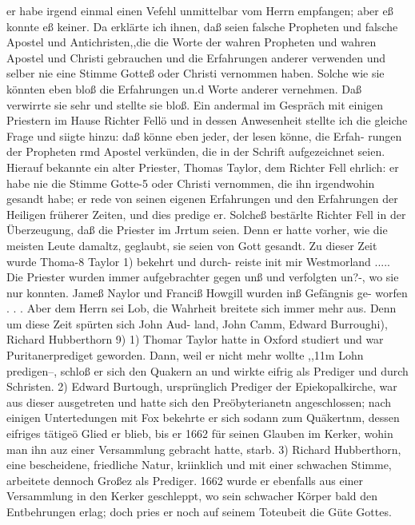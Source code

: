 er habe irgend einmal einen Vefehl unmittelbar vom Herrn
empfangen; aber eß konnte eß keiner. Da erklärte ich ihnen, daß
seien falsche Propheten und falsche Apostel und Antichristen,,die
die Worte der wahren Propheten und wahren Apostel und Christi
gebrauchen und die Erfahrungen anderer verwenden und selber
nie eine Stimme Gotteß oder Christi vernommen haben. Solche
wie sie könnten eben bloß die Erfahrungen un.d Worte anderer
vernehmen. Daß verwirrte sie sehr und stellte sie bloß. Ein
andermal im Gespräch mit einigen Priestern im Hause Richter
Fellö und in dessen Anwesenheit stellte ich die gleiche Frage und
siigte hinzu: daß könne eben jeder, der lesen könne, die Erfah-
rungen der Propheten rmd Apostel verkünden, die in der Schrift
aufgezeichnet seien. Hierauf bekannte ein alter Priester, Thomas
Taylor, dem Richter Fell ehrlich: er habe nie die Stimme Gotte-5
oder Christi vernommen, die ihn irgendwohin gesandt habe; er
rede von seinen eigenen Erfahrungen und den Erfahrungen der
Heiligen früherer Zeiten, und dies predige er. Solcheß bestärlte
Richter Fell in der Überzeugung, daß die Priester im Jrrtum
seien. Denn er hatte vorher, wie die meisten Leute damaltz,
geglaubt, sie seien von Gott gesandt.
Zu dieser Zeit wurde Thoma-8 Taylor 1) bekehrt und durch-
reiste init mir Westmorland ..... Die Priester wurden immer
aufgebrachter gegen unß und verfolgten un?-, wo sie nur konnten.
Jameß Naylor und Franciß Howgill wurden inß Gefängnis ge-
worfen . . . Aber dem Herrn sei Lob, die Wahrheit breitete sich
immer mehr aus. Denn um diese Zeit spürten sich John Aud-
land, John Camm, Edward Burroughi), Richard Hubberthorn 9)
1) Thomar Taylor hatte in Oxford studiert und war Puritanerprediget
geworden. Dann, weil er nicht mehr wollte ,,11m Lohn predigen--, schloß er
sich den Quakern an und wirkte eifrig als Prediger und durch Schristen.
2) Edward Burtough, ursprünglich Prediger der Epiekopalkirche, war
aus dieser ausgetreten und hatte sich den Preöbyterianetn angeschlossen; nach
einigen Untertedungen mit Fox bekehrte er sich sodann zum Quäkertnm, dessen
eifriges tätigeö Glied er blieb, bis er 1662 für seinen Glauben im Kerker, wohin
man ihn auz einer Versammlung gebracht hatte, starb.
3) Richard Hubberthorn, eine bescheidene, friedliche Natur, kriinklich und
mit einer schwachen Stimme, arbeitete dennoch Großez als Prediger. 1662 wurde
er ebenfalls aus einer Versammlung in den Kerker geschleppt, wo sein schwacher
Körper bald den Entbehrungen erlag; doch pries er noch auf seinem Toteubeit
die Güte Gottes.


